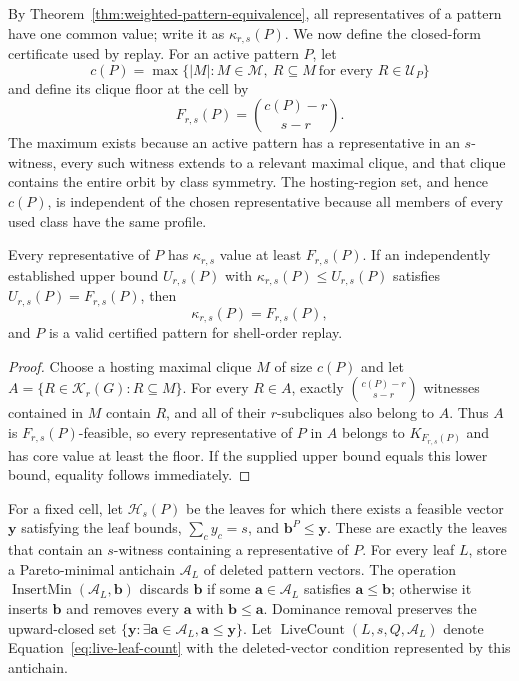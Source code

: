 By Theorem~\ref{thm:weighted-pattern-equivalence}, all representatives of a pattern have one common value; write it as $\kappa_{r,s}(P)$.
%
We now define the closed-form certificate used by replay.
%
For an active pattern $P$, let
\[
c(P)=\max\{|M|:M\in\mathcal M,\ R\subseteq M\ \text{for every }R\in\mathcal U_P\}
\]
and define its clique floor at the cell by
\begin{equation}
\label{eq:closed-form-floor}
F_{r,s}(P)=\binom{c(P)-r}{s-r}.
\end{equation}
The maximum exists because an active pattern has a representative in an $s$-witness, every such witness extends to a relevant maximal clique, and that clique contains the entire orbit by class symmetry.
%
The hosting-region set, and hence $c(P)$, is independent of the chosen representative because all members of every used class have the same profile.

\begin{lemma}
\label{lem:closed-form-certificate}
Every representative of $P$ has $\kappa_{r,s}$ value at least $F_{r,s}(P)$.
%
If an independently established upper bound $U_{r,s}(P)$ with $\kappa_{r,s}(P)\leq U_{r,s}(P)$ satisfies $U_{r,s}(P)=F_{r,s}(P)$, then
\[
\kappa_{r,s}(P)=F_{r,s}(P),
\]
and $P$ is a valid certified pattern for shell-order replay.
\end{lemma}
\begin{proof}
Choose a hosting maximal clique $M$ of size $c(P)$ and let $A=\{R\in\mathcal K_r(G):R\subseteq M\}$.
%
For every $R\in A$, exactly $\binom{c(P)-r}{s-r}$ witnesses contained in $M$ contain $R$, and all of their $r$-subcliques also belong to $A$.
%
Thus $A$ is $F_{r,s}(P)$-feasible, so every representative of $P$ in $A$ belongs to $K_{F_{r,s}(P)}$ and has core value at least the floor.
%
If the supplied upper bound equals this lower bound, equality follows immediately.
\end{proof}

For a fixed cell, let $\mathcal H_s(P)$ be the leaves for which there exists a feasible vector $\mathbf y$ satisfying the leaf bounds, $\sum_cy_c=s$, and $\mathbf b^P\leq\mathbf y$.
%
These are exactly the leaves that contain an $s$-witness containing a representative of $P$.
%
For every leaf $L$, store a Pareto-minimal antichain $\mathcal A_L$ of deleted pattern vectors.
%
The operation $\operatorname{InsertMin}(\mathcal A_L,\mathbf b)$ discards $\mathbf b$ if some $\mathbf a\in\mathcal A_L$ satisfies $\mathbf a\leq\mathbf b$; otherwise it inserts $\mathbf b$ and removes every $\mathbf a$ with $\mathbf b\leq\mathbf a$.
%
Dominance removal preserves the upward-closed set $\{\mathbf y:\exists\mathbf a\in\mathcal A_L,\mathbf a\leq\mathbf y\}$.
%
Let $\operatorname{LiveCount}(L,s,Q,\mathcal A_L)$ denote Equation~\eqref{eq:live-leaf-count} with the deleted-vector condition represented by this antichain.

